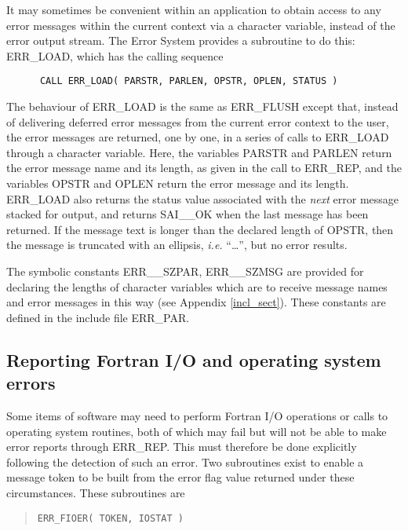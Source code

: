 It may sometimes be convenient within an application to obtain access to any 
error messages within the current context via a character variable,
instead of the error output stream.
The Error System provides a subroutine to do this: ERR\_LOAD, which has the
calling sequence

\begin {small}
\begin{verbatim}
      CALL ERR_LOAD( PARSTR, PARLEN, OPSTR, OPLEN, STATUS )
\end{verbatim}
\end {small}

The behaviour of ERR\_LOAD is the same as ERR\_FLUSH except that, instead of
delivering deferred error messages from the current error context to the
user, the error messages are returned, one by one, in a series of calls to
ERR\_LOAD through a character variable.
Here, the variables PARSTR and PARLEN return the error message name and its 
length, as given in the call to ERR\_REP, and the variables OPSTR and OPLEN 
return the error message and its length.
ERR\_LOAD also returns the status value associated with the {\em next} error 
message stacked for output, and returns SAI\_\_OK when the last message has
been returned.
If the message text is longer than the declared length of OPSTR, then the
message is truncated with an ellipsis, {\em i.e.} ``\ldots'', but no error 
results.

The symbolic constants ERR\_\_SZPAR, ERR\_\_SZMSG are provided for declaring 
the lengths of character variables which are to receive message names and
error messages in this way (see Appendix \ref{incl_sect}).
These constants are defined in the include file ERR\_PAR.


\subsection {Reporting Fortran I/O and operating system errors}
\label{fio_sect}

Some items of software may need to perform Fortran I/O operations or calls
to operating system routines, both of which may fail but will not be able to
make error reports through ERR\_REP. 
This must therefore be done explicitly following the detection of such an error.
Two subroutines exist to enable a message token to be built from
the error flag value returned under these circumstances. 
These subroutines are

\begin {quote}
\begin {small}
\begin{verbatim}
ERR_FIOER( TOKEN, IOSTAT )
\end{verbatim}
\end {small}
\end {quote}

